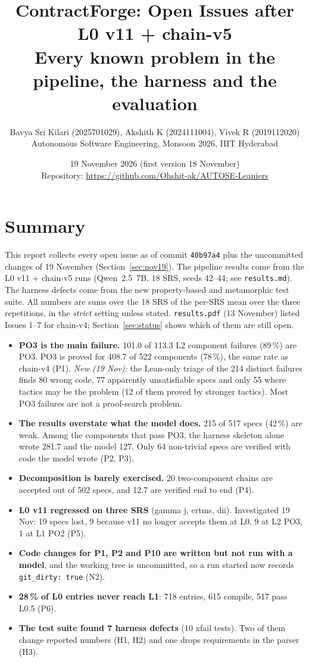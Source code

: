 \documentclass[11pt,a4paper]{article}
\title{\textbf{ContractForge: Open Issues after L0 v11 + chain-v5}\\[4pt]
\large Every known problem in the pipeline, the harness and the evaluation}
\author{Bavya Sri Kilari (2025701029), Akshith K (2024111004), Vivek R (2019112020)\\[2pt]
\small Autonomous Software Engineering, Monsoon 2026, IIIT Hyderabad}
\date{19 November 2026 (first version 18 November)\\[4pt]\small Repository: \url{https://github.com/Ohshit-ak/AUTOSE-Leaniers}}
\newcommand{\code}[1]{\texttt{#1}}
\newcommand{\file}[1]{\texttt{#1}}
\begin{document}
\maketitle

\section{Summary}

This report collects every open issue as of commit \code{40b97a4} plus the uncommitted changes of
19 November (Section~\ref{sec:nov19}). The pipeline results come from
the L0 v11 + chain-v5 runs (Qwen~2.5~7B, 18 SRS, seeds 42--44; see \file{results.md}). The harness
defects come from the new property-based and metamorphic test suite. All numbers are sums over the
18 SRS of the per-SRS mean over the three repetitions, in the \emph{strict} setting unless stated.
\file{results.pdf} (13 November) listed Issues 1--7 for chain-v4; Section~\ref{sec:status} shows
which of them are still open.

\begin{itemize}
  \item \textbf{PO3 is the main failure.} 101.0 of 113.3 L2 component failures (89\,\%) are PO3.
        PO3 is proved for 408.7 of 522 components (78\,\%), the same rate as chain-v4 (P1).
        \emph{New (19 Nov):} the Lean-only triage of the 214 distinct failures finds 80 wrong code,
        77 apparently unsatisfiable specs and only 55 where tactics may be the problem (12 of them proved
        by stronger tactics). Most PO3 failures are not a proof-search problem.
  \item \textbf{The results overstate what the model does.} 215 of 517 specs (42\,\%) are weak. Among
        the components that pass PO3, the harness skeleton alone wrote 281.7 and the model 127. Only
        64 non-trivial specs are verified with code the model wrote (P2, P3).
  \item \textbf{Decomposition is barely exercised.} 20 two-component chains are accepted out of 502
        specs, and 12.7 are verified end to end (P4).
  \item \textbf{L0 v11 regressed on three SRS} (gamma j, ertms, dii). Investigated 19 Nov: 19 specs lost,
        9 because v11 no longer accepts them at L0, 9 at L2 PO3, 1 at L1 PO2 (P5).
  \item \textbf{Code changes for P1, P2 and P10 are written but not run with a model}, and the working
        tree is uncommitted, so a run started now records \code{git\_dirty: true} (N2).
  \item \textbf{28\,\% of L0 entries never reach L1}: 718 entries, 615 compile, 517 pass L0.5 (P6).
  \item \textbf{The test suite found 7 harness defects} (10 xfail tests). Two of them change reported
        numbers (H1, H2) and one drops requirements in the parser (H3).
\end{itemize}
\end{document}

